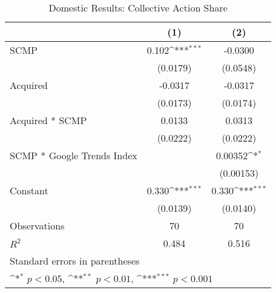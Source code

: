 \begin{table}[htbp]\centering
\def\sym#1{\ifmmode^{#1}\else\(^{#1}\)\fi}
\caption{Domestic Results: Collective Action Share\label{colldomestic}}
\begin{tabular*}{0.75\textwidth}{@{\hskip\tabcolsep\extracolsep\fill}l*{2}{c}}
\hline\hline
                &\multicolumn{1}{c}{(1)}         &\multicolumn{1}{c}{(2)}         \\
\hline
SCMP            &    0.102\sym{***}&  -0.0300         \\
                & (0.0179)         & (0.0548)         \\
[1em]
Acquired        &  -0.0317         &  -0.0317         \\
                & (0.0173)         & (0.0174)         \\
[1em]
Acquired * SCMP &   0.0133         &   0.0313         \\
                & (0.0222)         & (0.0222)         \\
[1em]
SCMP * Google Trends Index&                  &  0.00352\sym{*}  \\
                &                  &(0.00153)         \\
[1em]
Constant        &    0.330\sym{***}&    0.330\sym{***}\\
                & (0.0139)         & (0.0140)         \\
\hline
Observations    &       70         &       70         \\
\(R^{2}\)       &    0.484         &    0.516         \\
\hline\hline
\multicolumn{3}{l}{\footnotesize Standard errors in parentheses}\\
\multicolumn{3}{l}{\footnotesize \sym{*} \(p<0.05\), \sym{**} \(p<0.01\), \sym{***} \(p<0.001\)}\\
\end{tabular*}
\end{table}
